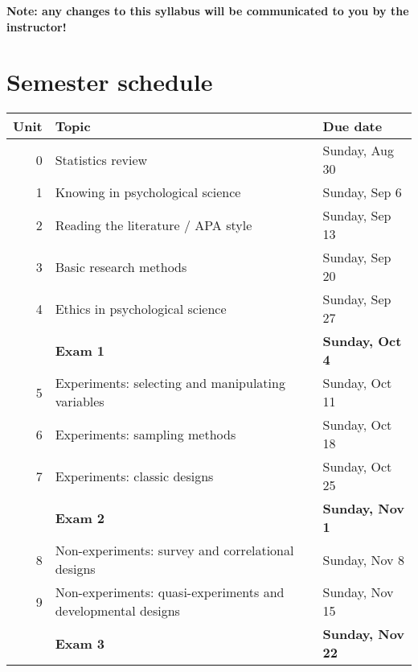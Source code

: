 \documentclass[10pt]{article}
\begin{document}
\textbf{Note:  any changes to this syllabus will be communicated to you by the instructor!}

\section*{Semester schedule}
\label{sec:orge3030ba}

\begin{center}
\begin{tabular}{rll}
Unit & Topic & Due date\\
\hline
0 & Statistics review & Sunday, Aug 30\\
1 & Knowing in psychological science & Sunday, Sep 6\\
2 & Reading the literature / APA style & Sunday, Sep 13\\
3 & Basic research methods & Sunday, Sep 20\\
4 & Ethics in psychological science & Sunday, Sep 27\\
 & \textbf{Exam 1} & \textbf{Sunday, Oct 4}\\
5 & Experiments: selecting and manipulating variables & Sunday, Oct 11\\
6 & Experiments: sampling methods & Sunday, Oct 18\\
7 & Experiments: classic designs & Sunday, Oct 25\\
 & \textbf{Exam 2} & \textbf{Sunday, Nov 1}\\
8 & Non-experiments: survey and correlational designs & Sunday, Nov 8\\
9 & Non-experiments: quasi-experiments and developmental designs & Sunday, Nov 15\\
 & \textbf{Exam 3} & \textbf{Sunday, Nov 22}\\
\end{tabular}
\end{center}
\end{document}
